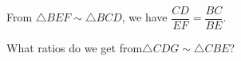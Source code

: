 




From $\triangle BEF \sim \triangle BCD$, we have $\dfrac{CD}{EF} = \dfrac{BC}{BE}$.

What ratios do we get from$\triangle CDG \sim \triangle CBE$?
















